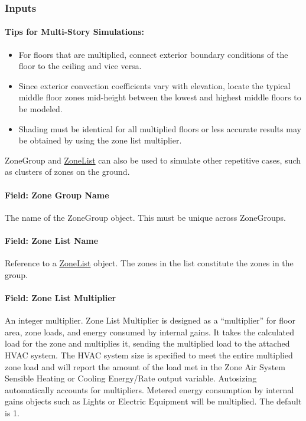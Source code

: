 \subsubsection{Inputs}\label{inputs-2-042}

\paragraph{Tips for Multi-Story Simulations:}\label{tips-for-multi-story-simulations}

\begin{itemize}
\item
  For floors that are multiplied, connect exterior boundary conditions of the floor to the ceiling and vice versa.
\item
  Since exterior convection coefficients vary with elevation, locate the typical middle floor zones mid-height between the lowest and highest middle floors to be modeled.
\item
  Shading must be identical for all multiplied floors or less accurate results may be obtained by using the zone list multiplier.
\end{itemize}

ZoneGroup and \hyperref[zonelist]{ZoneList} can also be used to simulate other repetitive cases, such as clusters of zones on the ground.

\paragraph{Field: Zone Group Name}\label{field-zone-group-name}

The name of the ZoneGroup object. This must be unique across ZoneGroups.

\paragraph{Field: Zone List Name}\label{field-zone-list-name-1}

Reference to a \hyperref[zonelist]{ZoneList} object. The zones in the list constitute the zones in the group.

\paragraph{Field: Zone List Multiplier}\label{field-zone-list-multiplier}

An integer multiplier. Zone List Multiplier is designed as a ``multiplier'' for floor area, zone loads, and energy consumed by internal gains. It takes the calculated load for the zone and multiplies it, sending the multiplied load to the attached HVAC system. The HVAC system size is specified to meet the entire multiplied zone load and will report the amount of the load met in the Zone Air System Sensible Heating or Cooling Energy/Rate output variable. Autosizing automatically accounts for multipliers. Metered energy consumption by internal gains objects such as Lights or Electric Equipment will be multiplied. The default is 1.


